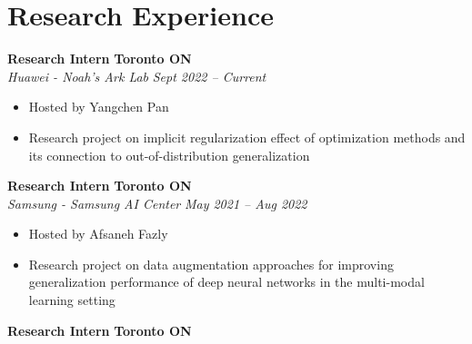 \section*{Research Experience}
    \vspace{\postsubhead}
      \vspace{\interlist}
      \textbf{Research Intern}
      \hfill
      \textbf{Toronto ON}\\
      \textit{Huawei - Noah's Ark Lab}
      \hfill
      \textit{Sept 2022 -- Current}
      \begin{itemize}
        \setlength\itemsep{0.2em}
        \item Hosted by Yangchen Pan
        \item Research project on implicit regularization effect of optimization methods and its connection to out-of-distribution generalization
      \end{itemize}
      \textbf{Research Intern}
      \hfill
      \textbf{Toronto ON}\\
      \textit{Samsung - Samsung AI Center}
      \hfill
      \textit{May 2021 -- Aug 2022}
      \begin{itemize}
        \setlength\itemsep{0.2em}
        \item Hosted by Afsaneh Fazly
        \item Research project on data augmentation approaches for improving generalization performance of deep neural networks in the multi-modal learning setting
      \end{itemize}
      \vspace{\interlist}
      \textbf{Research Intern}
      \hfill
      \textbf{Toronto ON}\\
